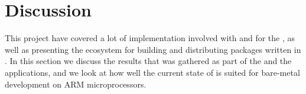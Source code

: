 
\chapter{Discussion}
\label{chap:discussion}

This project have covered a lot of implementation involved with {\rust} and {\C} for the {\gecko}, as well as presenting the ecosystem for building and distributing packages written in {\rust}.
In this section we discuss the results that was gathered as part of the {\tracker} and the {\cg} applications, and we look at how well the current state of {\rust} is suited for bare-metal development on ARM microprocessors.





%
